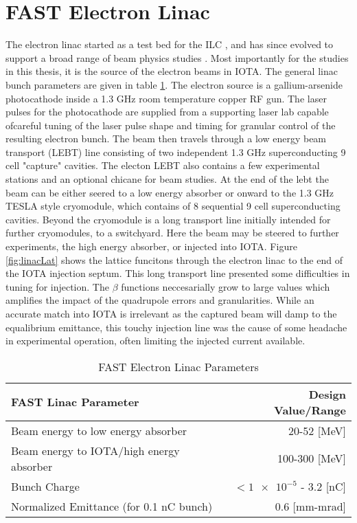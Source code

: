 \section{FAST Electron Linac}
The electron linac started as a test bed for the ILC \cite{fermiILC,recordGradient}, and has since evolved to support a broad range of beam physics studies \cite{fastGreens,NEB}. Most importantly for the studies in this thesis, it is the source of the electron beams in IOTA. The general linac bunch parameters are given in table \ref{tab:linac}. The electron source is a gallium-arsenide photocathode inside a 1.3 GHz room temperature copper RF gun. The laser pulses for the photocathode are supplied from a supporting laser lab capable ofcareful tuning of the laser pulse shape and timing for granular control of the resulting electron bunch. The beam then travels through a low energy beam transport (LEBT) line consisting of two independent 1.3 GHz superconducting 9 cell "capture" cavities. The electon LEBT also contains a few experimental stations and an optional chicane for beam studies. At the end of the lebt the beam can be either seered to a low energy absorber or onward to the 1.3 GHz TESLA style cryomodule, which contains of 8 sequential 9 cell superconducting cavities. Beyond the cryomodule is a long transport line initially intended for further cryomodules, to a switchyard. Here the beam may be steered to further experiments, the high energy absorber, or injected into IOTA. Figure \ref{fig:linacLat} shows the lattice funcitons through the electron linac to the end of the IOTA injection septum. This long transport line presented some difficulties in tuning for injection. The $\beta$ functions neccesarially grow to large values which amplifies the impact of the quadrupole errors and granularities. While an accurate match into IOTA is irrelevant as the captured beam will damp to the equalibrium emittance, this touchy injection line was the cause of some headache in experimental operation, often limiting the injected current available.

\begin{table}
    \centering
    \begin{tabular}{lr}
    \toprule
    \textbf{FAST Linac Parameter} & \textbf{Design Value/Range}\\
    \midrule
    Beam energy to low energy absorber & 20-52 [MeV]\\
    Beam energy to IOTA/high energy absorber & 100-300 [MeV]\\
    Bunch Charge & $<\num{1e-5}$ - 3.2 [nC]\\
    Normalized Emittance (for 0.1 nC bunch) & 0.6 [mm-mrad]\\
    \bottomrule
    \end{tabular}
    \caption{FAST Electron Linac Parameters}
    \label{tab:linac}
\end{table}


